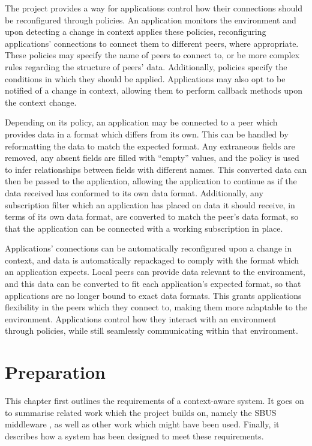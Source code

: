 \documentclass[12pt,twoside,notitlepage]{report}
\begin{document}
The project provides a way for applications control how their connections should be reconfigured through policies. 
An application monitors the environment and upon detecting a change in context applies these policies, reconfiguring applications' connections to connect them to different peers, where appropriate.
These policies may specify the name of peers to connect to, or be more complex rules regarding the structure of peers' data. 
Additionally, policies specify the conditions in which they should be applied. 
Applications may also opt to be notified of a change in context, allowing them to perform callback methods upon the context change.

Depending on its policy, an application may be connected to a peer which provides data in a format which differs from its own.
This can be handled by reformatting the data to match the expected format. 
Any extraneous fields are removed, any absent fields are filled with ``empty'' values, and the policy is used to infer relationships between fields with different names. 
This converted data can then be passed to the application, allowing the application to continue as if the data received has conformed to its own data format. 
Additionally, any subscription filter which an application has placed on data it should receive, in terms of its own data format, are converted to match the peer's data format, so that the application can be connected with a working subscription in place. 


Applications' connections can be automatically reconfigured upon a change in context, and data is automatically repackaged to comply with the format which an application expects. 
Local peers can provide data relevant to the environment, and this data can be converted to fit each application's expected format, so that applications are no longer bound to exact data formats. 
This grants applications flexibility in the peers which they connect to, making them more adaptable to the environment. 
Applications control how they interact with an environment through policies, while still seamlessly communicating within that environment.

\cleardoublepage

 
\chapter{Preparation}

This chapter first outlines the requirements of a context-aware system. 
It goes on to summarise related work which the project builds on, namely the SBUS middleware \cite{ingram2009reconfigurable}, as well as other work which might have been used. 
Finally, it describes how a system has been designed to meet these requirements.
\end{document}
